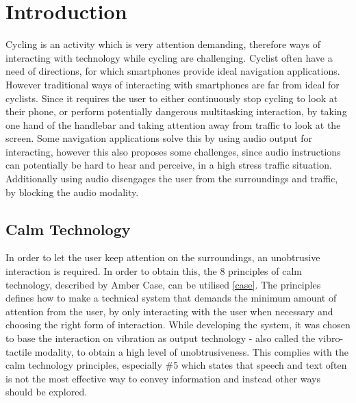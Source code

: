 \documentclass{sigchi}
\begin{document}
\section{Introduction}
Cycling is an activity which is very attention demanding, therefore ways of interacting with technology while cycling are challenging. Cyclist often have a need of directions, for which smartphones provide ideal navigation applications. However traditional ways of interacting with smartphones are far from ideal for cyclists. Since it requires the user to either continuously stop cycling to look at their phone, or perform potentially dangerous multitasking interaction, by taking one hand of the handlebar and taking attention away from traffic to look at the screen. 
\newline
\newline
Some navigation applications solve this by using audio output for interacting, however this also proposes some challenges, since audio instructions can potentially be hard to hear and perceive, in a high stress traffic situation. Additionally using audio disengages the user from the surroundings and traffic, by blocking the audio modality.
\subsection{Calm Technology}
In order to let the user keep attention on the surroundings, an unobtrusive interaction is required. In order to obtain this, the 8 principles of calm technology, described by Amber Case, can be utilised  \ref{case}. The principles  defines how to make a technical system that demands the minimum amount of attention from the user, by only interacting with the user when necessary and choosing the right form of  interaction.  
\newline
\newline 
While developing the system, it was chosen to base the interaction on vibration as output technology - also called the vibro-tactile modality, to obtain a high level of unobtrusiveness. This complies with the calm technology principles, especially  \#5 which states that speech and text often is not the most effective way to convey information and instead other ways should be explored.
\end{document}
